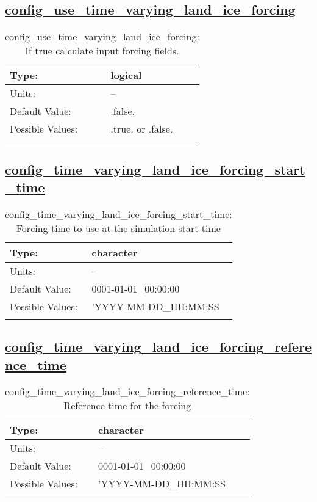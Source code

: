 \subsection[config\_use\_time\_varying\_land\_ice\_forcing]{\hyperref[sec:nm_tab_time_varying_forcing]{config\_use\_time\_varying\_land\_ice\_forcing}}
\label{subsec:nm_sec_config_use_time_varying_land_ice_forcing}
\begin{center}
\begin{longtable}{| p{2.0in} || p{4.0in} |}
    \hline
    Type: & logical \\
    \hline
    Units: & -- \\
    \hline
    Default Value: & .false. \\
    \hline
    Possible Values: & .true. or .false. \\
    \hline
    \caption{config\_use\_time\_varying\_land\_ice\_forcing: If true calculate input forcing fields.}
\end{longtable}
\end{center}
\subsection[config\_time\_varying\_land\_ice\_forcing\_start\_time]{\hyperref[sec:nm_tab_time_varying_forcing]{config\_time\_varying\_land\_ice\_forcing\_start\_time}}
\label{subsec:nm_sec_config_time_varying_land_ice_forcing_start_time}
\begin{center}
\begin{longtable}{| p{2.0in} || p{4.0in} |}
    \hline
    Type: & character \\
    \hline
    Units: & -- \\
    \hline
    Default Value: & 0001-01-01\_00:00:00 \\
    \hline
    Possible Values: & 'YYYY-MM-DD\_HH:MM:SS \\
    \hline
    \caption{config\_time\_varying\_land\_ice\_forcing\_start\_time: Forcing time to use at the simulation start time}
\end{longtable}
\end{center}
\subsection[config\_time\_varying\_land\_ice\_forcing\_reference\_time]{\hyperref[sec:nm_tab_time_varying_forcing]{config\_time\_varying\_land\_ice\_forcing\_reference\_time}}
\label{subsec:nm_sec_config_time_varying_land_ice_forcing_reference_time}
\begin{center}
\begin{longtable}{| p{2.0in} || p{4.0in} |}
    \hline
    Type: & character \\
    \hline
    Units: & -- \\
    \hline
    Default Value: & 0001-01-01\_00:00:00 \\
    \hline
    Possible Values: & 'YYYY-MM-DD\_HH:MM:SS \\
    \hline
    \caption{config\_time\_varying\_land\_ice\_forcing\_reference\_time: Reference time for the forcing}
\end{longtable}
\end{center}
